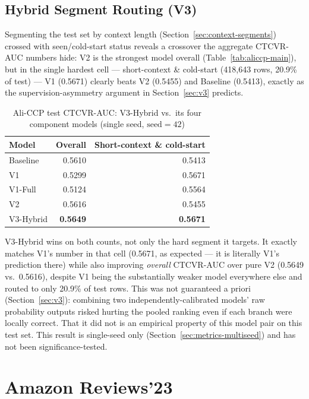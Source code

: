 \subsection{Hybrid Segment Routing (V3)}
\label{sec:results-v3-aliccp}

Segmenting the test set by context length (Section~\ref{sec:context-segments}) crossed with seen/cold-start status reveals a crossover the aggregate CTCVR-AUC numbers hide: V2 is the strongest model overall (Table~\ref{tab:aliccp-main}), but in the single hardest cell --- short-context \& cold-start (418{,}643 rows, 20.9\% of test) --- V1 (0.5671) clearly beats V2 (0.5455) and Baseline (0.5413), exactly as the supervision-asymmetry argument in Section~\ref{sec:v3} predicts.

\begin{table}[h]
\centering
\caption{Ali-CCP test CTCVR-AUC: V3-Hybrid vs.\ its four component models (single seed, $\text{seed}=42$)}
\label{tab:v3-results-aliccp}
\begin{tabular}{lrr}
\toprule
Model & Overall & Short-context \& cold-start \\
\midrule
Baseline    & 0.5610 & 0.5413 \\
V1          & 0.5299 & 0.5671 \\
V1-Full     & 0.5124 & 0.5564 \\
V2          & 0.5616 & 0.5455 \\
V3-Hybrid   & \textbf{0.5649} & \textbf{0.5671} \\
\bottomrule
\end{tabular}
\end{table}

V3-Hybrid wins on both counts, not only the hard segment it targets. It exactly matches V1's number in that cell (0.5671, as expected --- it is literally V1's prediction there) while also improving \emph{overall} CTCVR-AUC over pure V2 (0.5649 vs.\ 0.5616), despite V1 being the substantially weaker model everywhere else and routed to only 20.9\% of test rows. This was not guaranteed a priori (Section~\ref{sec:v3}): combining two independently-calibrated models' raw probability outputs risked hurting the pooled ranking even if each branch were locally correct. That it did not is an empirical property of this model pair on this test set. This result is single-seed only (Section~\ref{sec:metrics-multiseed}) and has not been significance-tested.

\section{Amazon Reviews'23}
\label{sec:results-amazon}

